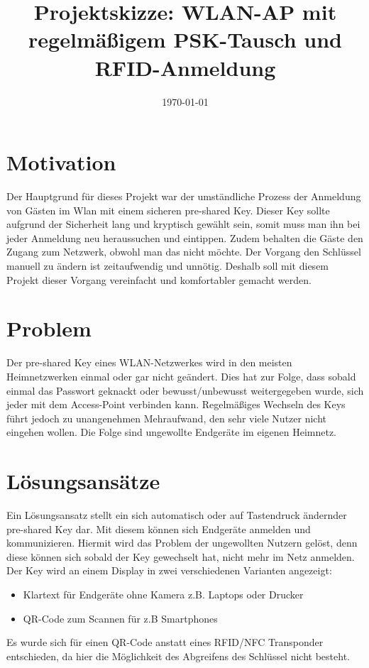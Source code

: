 \documentclass[a4paper]{article}
\title{Projektskizze: WLAN-AP mit regelmäßigem PSK-Tausch und RFID-Anmeldung}
\date{\today}
\begin{document}
	\maketitle
	
	\section{Motivation}
	Der Hauptgrund für dieses Projekt war der umständliche Prozess der Anmeldung von Gästen im Wlan mit einem sicheren pre-shared Key. Dieser Key sollte aufgrund der Sicherheit lang und kryptisch gewählt sein, somit muss man ihn bei jeder Anmeldung neu heraussuchen und eintippen. Zudem behalten die Gäste den Zugang zum Netzwerk, obwohl man das nicht möchte. Der Vorgang den Schlüssel manuell zu ändern ist zeitaufwendig und unnötig. Deshalb soll mit diesem Projekt dieser Vorgang vereinfacht und komfortabler gemacht werden. 
	
	\section{Problem}
	Der pre-shared Key eines WLAN-Netzwerkes wird in den meisten Heimnetzwerken einmal oder gar nicht geändert. Dies hat zur Folge, dass sobald einmal das Passwort geknackt oder bewusst/unbewusst weitergegeben wurde, sich jeder mit dem Access-Point verbinden kann. Regelmäßiges Wechseln des Keys führt jedoch zu unangenehmen Mehraufwand, den sehr viele Nutzer nicht eingehen wollen. Die Folge sind ungewollte Endgeräte im eigenen Heimnetz.

	\section{Lösungsansätze}
	Ein Lösungsansatz stellt ein sich automatisch oder auf Tastendruck ändernder pre-shared Key dar. Mit diesem können sich Endgeräte anmelden und kommunizieren. Hiermit wird das Problem der ungewollten Nutzern gelöst, denn diese können sich sobald der Key gewechselt hat, nicht mehr im Netz anmelden. Der Key wird an einem Display in zwei verschiedenen Varianten angezeigt:
	\begin{itemize}
		\item Klartext für Endgeräte ohne Kamera z.B. Laptops oder Drucker
		\item QR-Code zum Scannen für z.B Smartphones
	\end{itemize}
	Es wurde sich für einen QR-Code anstatt eines RFID/NFC Transponder entschieden, da hier die Möglichkeit des Abgreifens des Schlüssel nicht besteht. 
\end{document}
